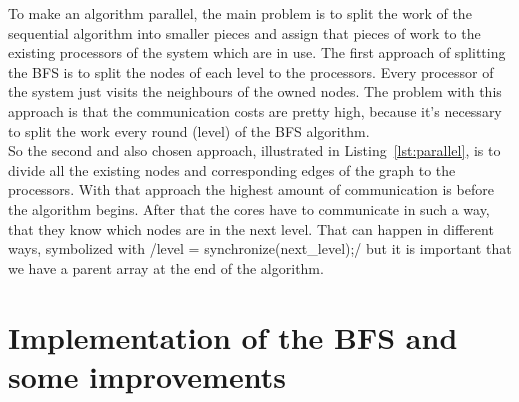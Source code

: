 \documentclass[12pt,a4paper]{article}
\begin{document}
To make an algorithm parallel, the main problem is to split the work of the sequential algorithm into smaller pieces and assign that pieces of work to the existing processors of the system which are in use.  The first approach of splitting the BFS is to split the nodes of each level to the processors. Every processor of the system just visits the neighbours of the owned nodes. The problem with this approach is that the communication costs are pretty high, because it's necessary to split the work every round (level) of the BFS algorithm.\\
So the second and also chosen approach, illustrated in Listing~\ref{lst:parallel}, is to divide all the existing nodes and corresponding edges of the graph to the processors. With that approach the highest amount of communication is before the algorithm begins. After that the cores have to communicate in such a way, that they know which nodes are in the next level. That can happen in different ways, symbolized with \cinline/level = synchronize(next_level);/ but it is important that we have a parent array at the end of the algorithm. 

\section{Implementation of the BFS and some improvements}
\label{sec:implementations}
\end{document}
